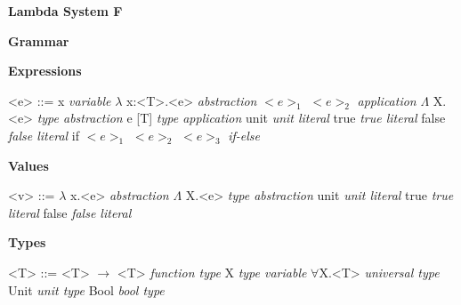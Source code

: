 \documentclass[11pt,oneside]{book}
\newcommand{\synlabel}[1]{\hfill \textit{#1}}
\begin{document}
\frontmatter

\mainmatter

\pagebreak

\begin{center}
    {
        \bf
        \huge
        Lambda System F
    }
\end{center}

\begin{center}
{
    \bf
    \huge
    Grammar
}
\end{center}

\setlength{\grammarindent}{10em} %

\setlength{\grammarparsep}{5pt} %

\textbf{Expressions}

\begin{grammar}

    <e> ::=  x                            \synlabel{variable}
        \alt $\lambda$ x:<T>.<e>          \synlabel{abstraction}
        \alt $<e>_1$ $<e>_2$              \synlabel{application}
        \alt $\Lambda$ X.<e>              \synlabel{type abstraction}
        \alt e [T]                        \synlabel{type application}
        \alt unit                         \synlabel{unit literal}
        \alt true                         \synlabel{true literal}
        \alt false                        \synlabel{false literal}
        \alt if $<e>_1$ $<e>_2$ $<e>_3$   \synlabel{if-else}

\end{grammar}

\textbf{Values}

\begin{grammar}

    <v> ::=  $\lambda$ x.<e>            \synlabel{abstraction}
        \alt $\Lambda$ X.<e>            \synlabel{type abstraction}
        \alt unit                       \synlabel{unit literal}
        \alt true                       \synlabel{true literal}
        \alt false                      \synlabel{false literal}

\end{grammar}

\textbf{Types}

\begin{grammar}

    <T> ::= <T> $\rightarrow$ <T>     \synlabel{function type}
        \alt X                        \synlabel{type variable}
        \alt $\forall$X.<T>           \synlabel{universal type}
        \alt Unit                     \synlabel{unit type}
        \alt Bool                     \synlabel{bool type}

\end{grammar}
\end{document}
